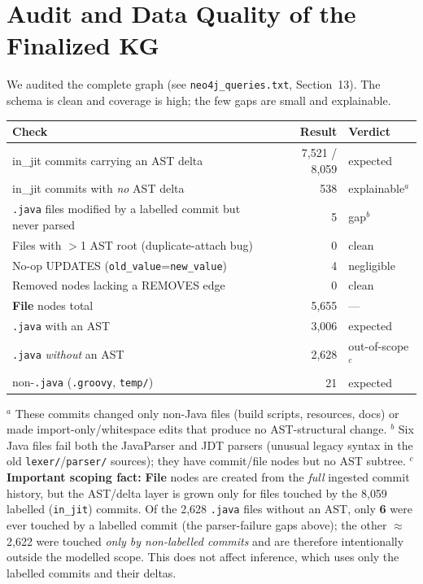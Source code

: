 \documentclass[11pt,a4paper]{article}
\newcommand{\code}[1]{\texttt{#1}}
\newcommand{\node}[1]{\textcolor{kgblue}{\textbf{#1}}}
\newcommand{\edge}[1]{\textsc{#1}}
\begin{document}
	\section{Audit and Data Quality of the Finalized KG}\label{sec:audit}
	We audited the complete graph (see \texttt{neo4j\_queries.txt}, Section~13). The
	schema is clean and coverage is high; the few gaps are small and explainable.
	
	\begin{center}
		\begin{tabular}{@{}p{9.2cm}rl@{}}
			\toprule
			\textbf{Check} & \textbf{Result} & \textbf{Verdict}\\
			\midrule
			in\_jit commits carrying an AST delta & 7{,}521 / 8{,}059 & expected\\
			in\_jit commits with \emph{no} AST delta & 538 & explainable$^{a}$\\
			\texttt{.java} files modified by a labelled commit but never parsed & 5 & gap$^{b}$\\
			Files with $>$1 AST root (duplicate-attach bug) & 0 & clean\\
			No-op \edge{UPDATES} (\code{old\_value}=\code{new\_value}) & 4 & negligible\\
			Removed nodes lacking a \edge{REMOVES} edge & 0 & clean\\
			\node{File} nodes total & 5{,}655 & ---\\
			\quad \texttt{.java} with an AST & 3{,}006 & expected\\
			\quad \texttt{.java} \emph{without} an AST & 2{,}628 & out-of-scope$^{c}$\\
			\quad non-\texttt{.java} (\texttt{.groovy}, \texttt{temp/}) & 21 & expected\\
			\bottomrule
		\end{tabular}
	\end{center}
	
	\footnotesize
	$^{a}$ These commits changed only non-Java files (build scripts, resources,
	docs) or made import-only/whitespace edits that produce no AST-structural change.
	$^{b}$ Six Java files fail both the JavaParser and JDT parsers (unusual legacy
	syntax in the old \texttt{lexer/}/\texttt{parser/} sources); they have
	commit/file nodes but no AST subtree. $^{c}$ \textbf{Important scoping fact:}
	\node{File} nodes are created from the \emph{full} ingested commit history, but
	the AST/delta layer is grown only for files touched by the 8{,}059 labelled
	(\code{in\_jit}) commits. Of the 2{,}628 \texttt{.java} files without an AST,
	only \textbf{6} were ever touched by a labelled commit (the parser-failure gaps
	above); the other $\approx$2{,}622 were touched \emph{only by non-labelled
		commits} and are therefore intentionally outside the modelled scope. This does
	not affect inference, which uses only the labelled commits and their deltas.
	\normalsize
	
\end{document}
